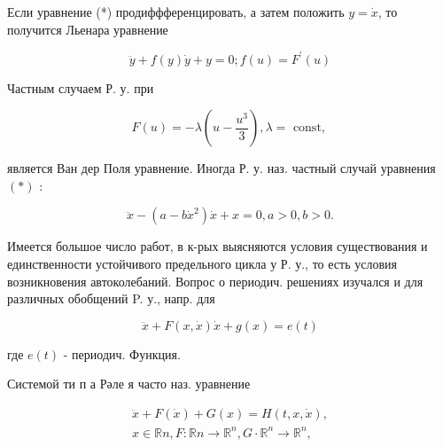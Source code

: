 \documentclass[10pt]{article}
\begin{document}
Если уравнение (*) продиффференцировать, а затем положить $y=\dot{x}$, то получится Льенара уравнение



\[

\ddot{y}+f(y) \dot{y}+y=0 ; f(u)=F^{\prime}(u)

\]



Частным случаем Р. у. при



\[

F(u)=-\lambda\left(u-\frac{u^{3}}{3}\right), \lambda=\text { const, }

\]



является Ван дер Поля уравнение. Иногда Р. у. наз. частный случай уравнения $(*)$ :



\[

\ddot{x}-\left(a-b \dot{x}^{2}\right) \dot{x}+x=0, a>0, b>0 .

\]



Имеется большое число работ, в к-рых выясняются условия существования и единственности устойчивого предельного цикла у Р. у., то есть условия возникновения автоколебаний. Вопрос о периодич. решениях изучался и для различных обобщений P. у., напр. для



\[

\ddot{x}+F(x, \dot{x}) \dot{x}+g(x)=e(t)

\]



где $e(t)$ - периодич. Функция.



Системой ти п а Рәле я часто наз. уравнение



\[

\begin{gathered}

\ddot{x}+F(\dot{x})+G(x)=H(t, x, \dot{x}), \\

x \in \mathbb{R} n, F: \mathbb{R} n \longrightarrow \mathbb{R}^{n}, G \cdot \mathbb{R}^{n} \longrightarrow \mathbb{R}^{n},

\end{gathered}

\]
\end{document}
